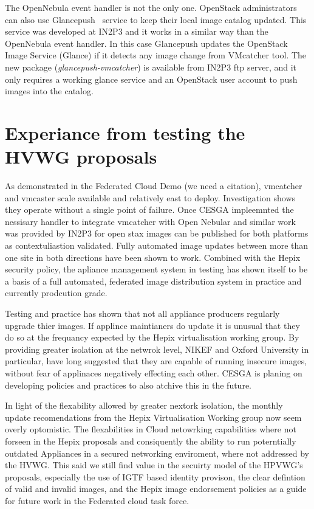 \documentclass{llncs_Ibergrid2013}
\begin{document}
The OpenNebula event handler is not the only one. OpenStack administrators can also use Glancepush~\cite{glancepush} service to keep their local image catalog updated. 
This service was developed at IN2P3 and it works in a similar way than the OpenNebula event handler. 
In this case Glancepush updates the OpenStack Image Service (Glance) if it detects any image change from VMcatcher tool. 
The new package (\textit{glancepush-vmcatcher}) is available from IN2P3 ftp server, and it only requires a working glance service and an OpenStack user account to push images into the catalog.



\section{Experiance from testing the HVWG proposals}
\label{sect-experiances}
As demonstrated in the Federated Cloud Demo (we need a citation), vmcatcher and vmcaster scale available and relatively east to deploy. Investigation shows they operate without a single point of failure. Once CESGA impleemnted the nessisary handler to integrate vmcatcher with Open Nebular and similar work was provided by IN2P3 for open stax images can be published for both platforms as contextuliastion validated. Fully automated image updates between more than one site in both directions have been shown to work. Combined with the Hepix security policy, the apliance management system in testing has shown itself to be a basis of a full automated, federated image distribution system in practice and currently prodcution grade.

Testing and practice has shown that not all appliance producers regularly upgrade thier images. If applince maintianers do update it is unusual that they do so at the frequancy expected by the Hepix virtualisation working group. By providing greater isolation at the netwrok level, NIKEF and Oxford University in particular, have long suggested that they are capable of running insecure images, without fear of applinaces negatively effecting each other. CESGA is planing on developing policies and practices to also atchive this in the future. 

In light of the flexability allowed by greater nextork isolation, the monthly update recomendations from the Hepix Virtualisation Working group now seem overly optomistic. The flexabilities in Cloud netowrking capabilities where not forseen in the Hepix proposals and consiquently the ability to run poterntially outdated Appliances in a secured networking enviroment, where not addressed by the HVWG. This said we still find value in the secuirty model of the HPVWG's proposals, especially the use of IGTF based identity provison, the clear defintion of valid and invalid images, and the Hepix image endorsement policies as a guide for future work in the Federated cloud task force.
\end{document}
